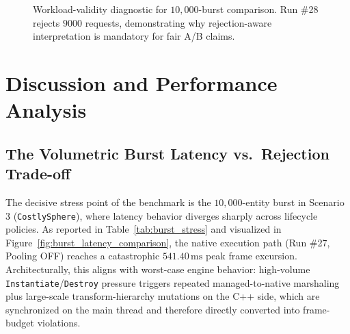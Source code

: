 \documentclass[11pt]{article}
\begin{document}
\begin{figure}[htbp]
    \centering
    \caption{Workload-validity diagnostic for \(10{,}000\)-burst comparison. Run \#28 rejects \(9000\) requests, demonstrating why rejection-aware interpretation is mandatory for fair A/B claims.}
    \label{fig:run27_29_rejections}
\end{figure}

\section{Discussion and Performance Analysis}

\subsection{The Volumetric Burst Latency vs.\ Rejection Trade-off}

The decisive stress point of the benchmark is the \(10{,}000\)-entity burst in Scenario 3 (\texttt{CostlySphere}), where latency behavior diverges sharply across lifecycle policies. As reported in Table~\ref{tab:burst_stress} and visualized in Figure~\ref{fig:burst_latency_comparison}, the native execution path (Run \#27, Pooling OFF) reaches a catastrophic \(541.40\,\mathrm{ms}\) peak frame excursion. Architecturally, this aligns with worst-case engine behavior: high-volume \texttt{Instantiate}/\texttt{Destroy} pressure triggers repeated managed-to-native marshaling plus large-scale transform-hierarchy mutations on the C++ side, which are synchronized on the main thread and therefore directly converted into frame-budget violations.
\end{document}
